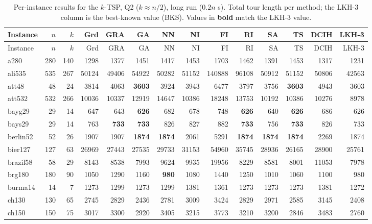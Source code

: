 {\footnotesize\setlength{\tabcolsep}{3pt}
\begin{longtable}{l r r r r r r r r r r r r r}
\caption{Per-instance results for the $k$-TSP, Q2 ($k\approx n/2$), long run ($0.2n$ s). Total tour length per method; the LKH-3 column is the best-known value (BKS). Values in \textbf{bold} match the LKH-3 value.}\label{tab:app_lr_medium}\\
\hline Instance & $n$ & $k$ & Grd & GRA & GA & NN & NI & FI & RI & SA & TS & DCIH & LKH-3 \\ \hline \endfirsthead
\hline Instance & $n$ & $k$ & Grd & GRA & GA & NN & NI & FI & RI & SA & TS & DCIH & LKH-3 \\ \hline \endhead
\hline \endfoot
a280 & 280 & 140 & 1298 & 1377 & 1451 & 1417 & 1453 & 1703 & 1462 & 1391 & 1453 & 1317 & 1231 \\
ali535 & 535 & 267 & 50124 & 49406 & 54922 & 50282 & 51152 & 140888 & 96108 & 50912 & 51152 & 50806 & 42563 \\
att48 & 48 & 24 & 3814 & 4063 & \textbf{3603} & 3924 & 3943 & 6477 & 3797 & 3756 & \textbf{3603} & 4943 & 3603 \\
att532 & 532 & 266 & 10036 & 10337 & 12919 & 14647 & 10386 & 18248 & 13753 & 10192 & 10386 & 10276 & 8978 \\
bayg29 & 29 & 14 & 647 & 643 & \textbf{626} & 682 & 678 & 748 & \textbf{626} & 640 & \textbf{626} & 686 & 626 \\
bays29 & 29 & 14 & 763 & \textbf{733} & \textbf{733} & 826 & 827 & 882 & \textbf{733} & 756 & \textbf{733} & 826 & 733 \\
berlin52 & 52 & 26 & 1907 & 1907 & \textbf{1874} & \textbf{1874} & 2061 & 5291 & \textbf{1874} & \textbf{1874} & \textbf{1874} & 2269 & 1874 \\
bier127 & 127 & 63 & 26969 & 27443 & 27535 & 29733 & 31153 & 54960 & 35745 & 28936 & 26165 & 28900 & 25761 \\
brazil58 & 58 & 29 & 8143 & 8538 & 7993 & 9624 & 9935 & 19956 & 8229 & 8581 & 8001 & 11053 & 7978 \\
brg180 & 180 & 90 & 1050 & 1290 & 1160 & \textbf{980} & 1080 & 1440 & 1250 & 1010 & 1060 & 1100 & 980 \\
burma14 & 14 & 7 & 1273 & 1299 & 1273 & 1299 & 1381 & 1361 & 1273 & 1273 & 1273 & 1381 & 1272 \\
ch130 & 130 & 65 & 2745 & 2829 & 2436 & 2781 & 3009 & 3424 & 2829 & 2971 & 2585 & 3145 & 2408 \\
ch150 & 150 & 75 & 3017 & 3300 & 2920 & 3405 & 3215 & 3773 & 3210 & 3200 & 2846 & 3483 & 2760 \\

\end{longtable}}
